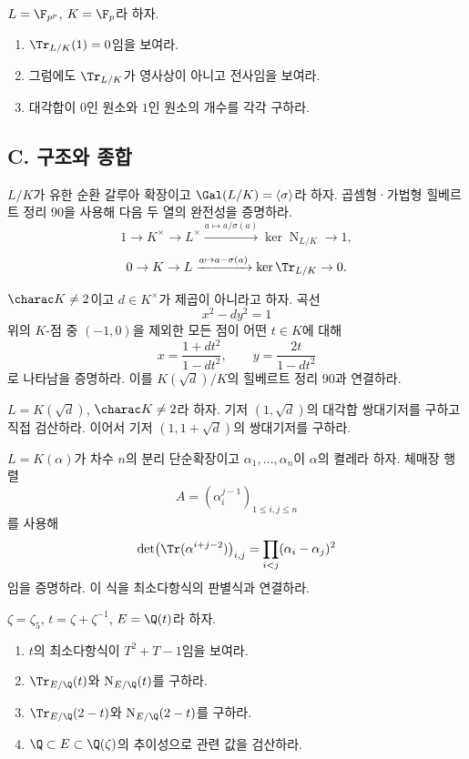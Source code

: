 \begin{exercise}
$L=\F_{p^p}$, $K=\F_p$라 하자.
\begin{enumerate}[label=(\alph*)]
  \item $\Tr_{L/K}(1)=0$임을 보여라.
  \item 그럼에도 $\Tr_{L/K}$가 영사상이 아니고 전사임을 보여라.
  \item 대각합이 $0$인 원소와 $1$인 원소의 개수를 각각 구하라.
\end{enumerate}
\end{exercise}

\subsection*{C. 구조와 종합}

\begin{exercise}[*]
\label{ex:hilbert90-exact-sequences}
$L/K$가 유한 순환 갈루아 확장이고 $\Gal(L/K)=\langle\sigma\rangle$라 하자. 곱셈형·가법형 힐베르트 정리 90을 사용해 다음 두 열의 완전성을 증명하라.
\[
  1\to K^\times\to L^\times
  \xrightarrow{a\mapsto a/\sigma(a)}
  \ker\operatorname N_{L/K}\to1,
\]
\[
  0\to K\to L
  \xrightarrow{a\mapsto a-\sigma(a)}
  \ker\Tr_{L/K}\to0.
\]
\end{exercise}

\begin{exercise}
$\charac K\ne2$이고 $d\in K^\times$가 제곱이 아니라고 하자. 곡선
\[
  x^2-dy^2=1
\]
위의 $K$-점 중 $(-1,0)$을 제외한 모든 점이 어떤 $t\in K$에 대해
\[
  x=\frac{1+dt^2}{1-dt^2},
  \qquad
  y=\frac{2t}{1-dt^2}
\]
로 나타남을 증명하라. 이를 $K(\sqrt d)/K$의 힐베르트 정리 90과 연결하라.
\end{exercise}

\begin{exercise}
$L=K(\sqrt d)$, $\charac K\ne2$라 하자. 기저 $(1,\sqrt d)$의 대각합 쌍대기저를 구하고 직접 검산하라. 이어서 기저 $(1,1+\sqrt d)$의 쌍대기저를 구하라.
\end{exercise}

\begin{exercise}[*]
\label{ex:power-basis-trace-discriminant}
$L=K(\alpha)$가 차수 $n$의 분리 단순확장이고 $\alpha_1,\dots,\alpha_n$이 $\alpha$의 켤레라 하자. 체매장 행렬
\[
  A=(\alpha_i^{j-1})_{1\le i,j\le n}
\]
를 사용해
\[
  \det\bigl(\Tr(\alpha^{i+j-2})\bigr)_{i,j}
  =\prod_{i<j}(\alpha_i-\alpha_j)^2
\]
임을 증명하라. 이 식을 최소다항식의 판별식과 연결하라.
\end{exercise}

\begin{exercise}
$\zeta=\zeta_5$, $t=\zeta+\zeta^{-1}$, $E=\Q(t)$라 하자.
\begin{enumerate}[label=(\alph*)]
  \item $t$의 최소다항식이 $T^2+T-1$임을 보여라.
  \item $\Tr_{E/\Q}(t)$와 $\operatorname N_{E/\Q}(t)$를 구하라.
  \item $\Tr_{E/\Q}(2-t)$와 $\operatorname N_{E/\Q}(2-t)$를 구하라.
  \item $\Q\subset E\subset\Q(\zeta)$의 추이성으로 관련 값을 검산하라.
\end{enumerate}
\end{exercise}

